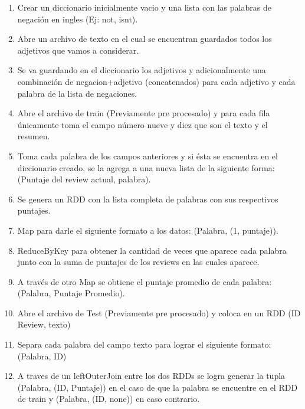 \documentclass[a4paper,11pt]{report}
\begin{document}
\begin{enumerate}[1.]
    \item Crear un diccionario inicialmente vacio y una lista con las palabras de negación en ingles (Ej: not, isnt).
    
    \item Abre un archivo de texto en el cual se encuentran guardados todos los adjetivos que vamos a considerar.
    
    \item Se va guardando en el diccionario los adjetivos y adicionalmente una combinación de negacion+adjetivo (concatenados) para cada adjetivo y cada palabra de la lista de negaciones.
    
    \item Abre el archivo de train (Previamente pre procesado) y para cada fila únicamente toma el campo número nueve y diez que son el texto y el resumen.
    
    \item Toma cada palabra de los campos anteriores y si ésta se encuentra en el diccionario creado, se la agrega a una nueva lista de la siguiente forma: (Puntaje del review actual, palabra).
    
    \item Se genera un RDD con la lista completa de palabras con sus respectivos puntajes.
    
    \item Map para darle el siguiente formato a los datos: (Palabra, (1, puntaje)).
    
    \item ReduceByKey para obtener la cantidad de veces que aparece cada palabra junto con la suma de puntajes de los reviews en las cuales aparece.
    
    \item A través de otro Map se obtiene el puntaje promedio de cada palabra: (Palabra, Puntaje Promedio).
    
    \item Abre el archivo de Test (Previamente pre procesado) y coloca en un RDD (ID Review, texto)
    
    \item Separa cada palabra del campo texto para lograr el siguiente formato: (Palabra, ID)
    
    \item A traves de un leftOuterJoin entre los dos RDDs se logra generar la tupla (Palabra, (ID, Puntaje)) en el caso de que la palabra se encuentre en el RDD de train y (Palabra, (ID, none)) en caso contrario.
    

\end{enumerate}
\end{document}
